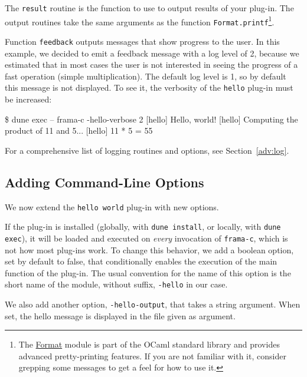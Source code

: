The \texttt{result} routine is the function to use to output results of your
plug-in. The \framac output routines take the same arguments as the \caml
function \texttt{Format.printf}\footnote{The
\href{https://v2.ocaml.org/api/Format.html}{Format} module is part of the
OCaml standard library and provides advanced pretty-printing features.
If you are not familiar with it, consider grepping some \framac messages
to get a feel for how to use it.}.

Function \texttt{feedback} outputs messages that show progress to the
user. In this example, we decided to emit a feedback message with a log level
of 2, because we estimated that in most cases the user is not interested in
seeing the progress of a fast operation (simple multiplication). The default
log level is 1, so by default this message is not displayed. To see
it, the verbosity of the \texttt{hello} plug-in must be increased:

\begin{frama-c-commands}
\$ dune exec -- frama-c -hello-verbose 2
[hello] Hello, world!
[hello] Computing the product of 11 and 5...
[hello] 11 * 5 = 55
\end{frama-c-commands}

For a comprehensive list of logging routines and options, see
Section~\ref{adv:log}.

\subsection{Adding Command-Line Options}\label{tut2:basic-options}

We now extend the \texttt{hello world} plug-in with new options.

If the plug-in is installed (globally, with \verb|dune install|, or locally,
with \verb|dune exec|), it will be loaded and
executed on {\em every} invocation of \texttt{frama-c}, which is not how most
plug-ins work. To change this behavior, we add a boolean option, set by default
to false, that conditionally enables the execution of the main function of the
plug-in. The usual convention for the name of this option is the short
name of the module, without suffix, \ie \texttt{-hello} in our case.

We also add another option, \texttt{-hello-output}, that takes a string
argument. When set, the hello message is displayed in the file given as
argument.



